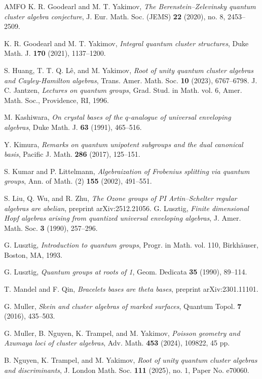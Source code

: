 \documentclass[11pt]{amsart}
\theoremstyle{plain}
\begin{document}
\begin{thebibliography}{AMFO}
 K. R. Goodearl and M. T. Yakimov, {\em{The Berenstein--Zelevinsky quantum cluster algebra conjecture}}, J. Eur. Math. Soc. (JEMS) 
{\bf{22}} (2020), no. 8, 2453--2509.

 K. R. Goodearl and M. T. Yakimov, {\em{Integral quantum cluster structures}}, Duke Math. J. {\bf{170}} (2021), 1137--1200.

 S. Huang, T. T. Q. L\^{e}, and M. Yakimov, {\em{Root of unity quantum cluster algebras and Cayley-Hamilton algebras}}, Trans. Amer. Math. Soc. {\bf{10}} (2023), 6767--6798.
 J. C. Jantzen, {\em{Lectures on quantum groups}}, Grad. Stud. in Math. vol. 6, Amer. Math. Soc., Providence, RI, 1996.

 M. Kashiwara, {\em{On crystal bases of the $q$-analogue of universal enveloping algebras}}, Duke Math. J. {\bf{63}} (1991), 465--516.

 Y. Kimura, {\em{Remarks on quantum unipotent subgroups and the dual canonical basis}}, Pacific J. Math. {\bf{286}} (2017), 125--151.

 S. Kumar and P. Littelmann, {\em{Algebraization of Frobenius splitting via quantum groups}}, Ann. of Math. (2) {\bf{155}} (2002), 491--551.

 S. Liu, Q. Wu, and R. Zhu, {\em{The Ozone groups of PI Artin--Schelter regular algebras are abelian}}, preprint arXiv:2512.21056. 
 G. Lusztig, {\em{Finite dimensional Hopf algebras arising from quantized universal enveloping algebras}}, J. Amer. Math. Soc. {\bf{3}} (1990), 257--296.

 G. Lusztig, {\em{Introduction to quantum groups}}, Progr. in Math. vol. 110, Birkh\"auser, Boston, MA, 1993.

 G. Lusztig, {\em{Quantum groups at roots of 1}}, Geom. Dedicata {\bf{35}} (1990), 89--114.

 T. Mandel and F. Qin, {\em{Bracelets bases are theta bases}}, preprint arXiv:2301.11101.  

 G. Muller, {\em{Skein and cluster algebras of marked surfaces}}, Quantum Topol. {\bf{7}} (2016), 435--503.

 G. Muller, B. Nguyen, K. Trampel, and M. Yakimov, {\em{Poisson geometry and Azumaya loci of cluster algebras}}, 
Adv. Math. {\bf{453}} (2024), 109822, 45 pp.

 B. Nguyen, K. Trampel, and M. Yakimov, {\em{Root of unity quantum cluster algebras and discriminants}}, J. London Math. Soc. {\bf{111}} (2025), no. 1, Paper No. e70060.


\end{thebibliography}
\end{document}
